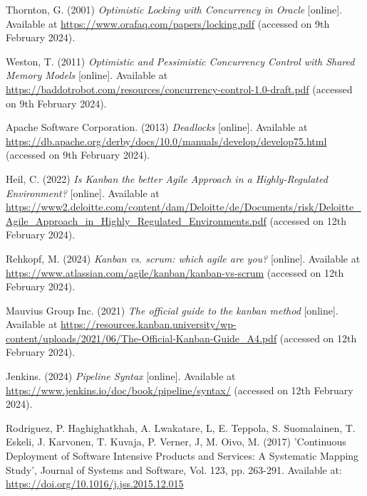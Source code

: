 \noindent Thornton, G. (2001) \textit{Optimistic Locking with Concurrency in Oracle} [online]. Available at \url{https://www.orafaq.com/papers/locking.pdf} (accessed on 9th February 2024).
\vspace{0.2cm}

\noindent Weston, T. (2011) \textit{Optimistic and Pessimistic Concurrency Control with Shared Memory Models} [online]. Available at \url{https://baddotrobot.com/resources/concurrency-control-1.0-draft.pdf} (accessed on 9th February 2024).
\vspace{0.2cm}

\noindent Apache Software Corporation. (2013) \textit{Deadlocks} [online]. Available at \url{https://db.apache.org/derby/docs/10.0/manuals/develop/develop75.html} (accessed on 9th February 2024).
\vspace{0.2cm}

\noindent Heil, C. (2022) \textit{Is Kanban the better Agile Approach in a Highly-Regulated Environment?} [online]. Available at \url{https://www2.deloitte.com/content/dam/Deloitte/de/Documents/risk/Deloitte_Agile_Approach_in_Highly_Regulated_Environments.pdf} (accessed on 12th February 2024).
\vspace{0.2cm}

\noindent Rehkopf, M. (2024) \textit{Kanban vs. scrum: which agile are you?} [online]. Available at \url{https://www.atlassian.com/agile/kanban/kanban-vs-scrum} (accessed on 12th February 2024).
\vspace{0.2cm}

\noindent Mauvius Group Inc. (2021) \textit{The official guide to the kanban method} [online]. Available at \url{https://resources.kanban.university/wp-content/uploads/2021/06/The-Official-Kanban-Guide_A4.pdf} (accessed on 12th February 2024).
\vspace{0.2cm}

\noindent Jenkins. (2024) \textit{Pipeline Syntax} [online]. Available at \url{https://www.jenkins.io/doc/book/pipeline/syntax/} (accessed on 12th February 2024).
\vspace{0.2cm}

\noindent Rodriguez, P. Haghighatkhah, A. Lwakatare, L, E. Teppola, S. Suomalainen, T. Eskeli, J. Karvonen, T. Kuvaja, P. Verner, J, M. Oivo, M. (2017) 'Continuous Deployment of Software Intensive Products and Services: A Systematic Mapping Study', Journal of Systems and Software, Vol. 123, pp. 263-291. Available at: \url{https://doi.org/10.1016/j.jss.2015.12.015}
\vspace{0.2cm}


